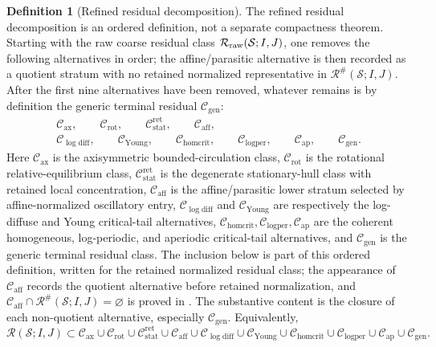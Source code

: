 \documentclass[11pt]{amsart}
\numberwithin{equation}{section}
\theoremstyle{plain}
\theoremstyle{definition}
\newtheorem{definition}[theorem]{Definition}
\theoremstyle{remark}
\newcommand{\calS}{\mathcal S}
\newcommand{\calR}{\mathcal R}
\newcommand{\Cax}{\mathcal C_{\mathrm{ax}}}
\newcommand{\Crot}{\mathcal C_{\mathrm{rot}}}
\newcommand{\Cstat}{\mathcal C_{\mathrm{stat}}^{\mathrm{ret}}}
\newcommand{\Caff}{\mathcal C_{\mathrm{aff}}}
\newcommand{\Cgen}{\mathcal C_{\mathrm{gen}}}
\newcommand{\Chomcrit}{\mathcal C_{\mathrm{homcrit}}}
\newcommand{\Clogper}{\mathcal C_{\mathrm{logper}}}
\newcommand{\Capcrit}{\mathcal C_{\mathrm{ap}}}
\newcommand{\Cyoung}{\mathcal C_{\mathrm{Young}}}
\newcommand{\Clogdiff}{\mathcal C_{\log\mathrm{diff}}}
\begin{document}
\begin{definition}[Refined residual decomposition]
\label{def:refined-decomposition}
The refined residual decomposition is an ordered definition, not a separate
compactness theorem.  Starting with the raw coarse residual class
\(\calR_{\rm raw}(\calS;I,J)\), one removes the following alternatives in
order; the affine/parasitic alternative is then recorded as a quotient stratum
with no retained normalized representative in \(\calR^\#(\calS;I,J)\).  After
the first nine alternatives have been removed, whatever remains is by definition
the generic terminal residual \(\Cgen\):
\[
\begin{gathered}
   \Cax,\qquad \Crot,\qquad \Cstat,\qquad \Caff,\\
   \Clogdiff,\qquad \Cyoung,\qquad
   \Chomcrit,\qquad \Clogper,\qquad \Capcrit,\qquad \Cgen .
\end{gathered}
\]
Here \(\Cax\) is the axisymmetric bounded-circulation class, \(\Crot\) is the
rotational relative-equilibrium class, \(\Cstat\) is the degenerate
stationary-hull class with retained local concentration, \(\Caff\) is the
affine/parasitic lower stratum selected by affine-normalized oscillatory entry,
\(\Clogdiff\) and \(\Cyoung\) are respectively the log-diffuse and Young
critical-tail alternatives, \(\Chomcrit,\Clogper,\Capcrit\) are the coherent
homogeneous, log-periodic, and aperiodic critical-tail alternatives, and \(\Cgen\)
is the generic terminal residual class.  The inclusion below is part of this
ordered definition, written for the retained normalized residual class; the
appearance of \(\Caff\) records the quotient alternative before retained
normalization, and \(\Caff\cap\calR^\#(\calS;I,J)=\varnothing\) is proved in
.  The substantive content is the
closure of each non-quotient alternative, especially \(\Cgen\).  Equivalently,
\begin{equation}\label{eq:complete-residual-decomposition}
   \calR(\calS;I,J)
   \subset
   \Cax\cup\Crot\cup\Cstat\cup\Caff
   \cup\Clogdiff\cup\Cyoung\cup\Chomcrit\cup\Clogper\cup\Capcrit
   \cup\Cgen .
\end{equation}
\end{definition}
\end{document}
